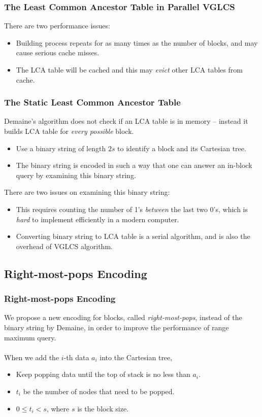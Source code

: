 \begin{frame}
	\frametitle{The Least Common Ancestor Table in Parallel VGLCS}
	There are two performance issues:
	\begin{itemize}
		\setlength\itemsep{1em}
		\item 
			Building process repeats for as many times as the number of
			blocks, and may cause serious cache misses.
		\item
			The LCA table will be cached and this may {\em evict} other
			LCA tables from cache.
	\end{itemize}
\end{frame}

\begin{frame}
	\frametitle{The Static Least Common Ancestor Table}
	Demaine's algorithm does not check if an LCA table is in memory --
	instead it builds LCA table for {\em every possible} block.
	\begin{itemize}
		\setlength\itemsep{1em}
		\item 
			Use a binary string of length $2s$ to identify a block and
			its Cartesian tree.
		\item
			The binary string is encoded in such a way that one can
			answer an in-block query by examining this binary string.
	\end{itemize}
\end{frame}

\begin{frame}
	There are two issues on examining this binary string:
	\begin{itemize}
		\setlength\itemsep{1em}
		\item 
			This requires counting the number of 1's {\em between} the
			last two 0's, which is {\em hard} to implement efficiently
			in a modern computer.
		\item
			Converting binary string to LCA table is a serial algorithm,
			and is also the overhead of VGLCS algorithm.
	\end{itemize}
\end{frame}

\subsection{Right-most-pops Encoding}
\begin{frame}
    \frametitle{Right-most-pops Encoding}
    We propose a new encoding for blocks, called {\em right-most-pops},
	instead of the binary string by Demaine, in order to improve the
	performance of range maximum query.
	\\~\\
	When we add the $i$-th data $a_i$ into the Cartesian tree, 
	\begin{itemize}
		\setlength\itemsep{1em}
		\item
			Keep popping data until the top of stack is no less than
			$a_i$.
		\item 
			$t_i$ be the number of nodes that need to be popped.
		\item
			$0 \le t_i < s$, where $s$ is the block size.
	\end{itemize}

\end{frame}

